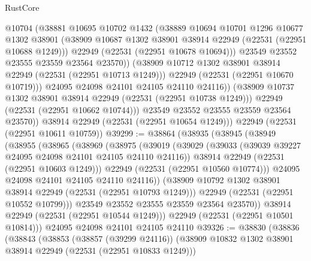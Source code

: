 \begin{lexlean}{RustCore}
\begin{coremodule}
                    @10704
                    (@38881
                      @10695
                      @10702
                      @1432
                      (@38889
                        @10694
                        @10701
                        @1296
                        @10677
                        @1302
                        @38901
                        (@38909 @10687 @1302 @38901 @38914 @22949 (@22531 (@22951 @10688 @1249)))
                        @22949
                        (@22531 (@22951 @10678 @10694)))
                      @23549
                      @23552
                      @23555
                      @23559
                      @23564
                      @23570))
                  (@38909 @10712 @1302 @38901 @38914 @22949 (@22531 (@22951 @10713 @1249)))
                  @22949
                  (@22531 (@22951 @10670 @10719)))
                @24095
                @24098
                @24101
                @24105
                @24110
                @24116))
            (@38909 @10737 @1302 @38901 @38914 @22949 (@22531 (@22951 @10738 @1249)))
            @22949
            (@22531 (@22951 @10662 @10744)))
          @23549
          @23552
          @23555
          @23559
          @23564
          @23570))
      @38914
      @22949
      (@22531 (@22951 @10654 @1249)))
    @22949
    (@22531 (@22951 @10611 @10759))
@39299 := @38864
    (@38935
      (@38945
        (@38949
          (@38955
            (@38965
              (@38969
                (@38975
                  (@39019
                    (@39029
                      (@39033 (@39039 @39227 @24095 @24098 @24101 @24105 @24110 @24116))
                      @38914
                      @22949
                      (@22531 (@22951 @10603 @1249)))
                    @22949
                    (@22531 (@22951 @10560 @10774)))
                  @24095
                  @24098
                  @24101
                  @24105
                  @24110
                  @24116))
              (@38909 @10792 @1302 @38901 @38914 @22949 (@22531 (@22951 @10793 @1249)))
              @22949
              (@22531 (@22951 @10552 @10799)))
            @23549
            @23552
            @23555
            @23559
            @23564
            @23570))
        @38914
        @22949
        (@22531 (@22951 @10544 @1249)))
      @22949
      (@22531 (@22951 @10501 @10814)))
    @24095
    @24098
    @24101
    @24105
    @24110
@39326 := @38830
    (@38836
      (@38843
        (@38853
          (@38857 (@39299 @24116))
          (@38909 @10832 @1302 @38901 @38914 @22949 (@22531 (@22951 @10833 @1249)))

\end{coremodule}
\end{lexlean}
